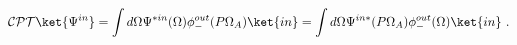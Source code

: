 \begin{equation}
\mathcal{CPT}\ket{\Psi^{in}}=
\int d\Omega \Psi^{*in}(\Omega)
\phi^{out}_-(P\Omega_A)\ket{in}=
\int d\Omega \Psi^{in *}
(P\Omega_A)
\phi^{out}_-(\Omega)\ket{in} \ .
\end{equation}

